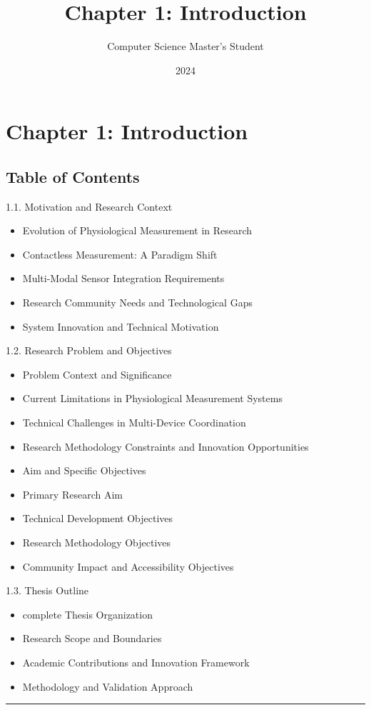 \documentclass[11pt,a4paper]{article}
\title{Chapter 1: Introduction}
\author{Computer Science Master's Student}
\date{2024}
\begin{document}
\maketitle

\section{Chapter 1: Introduction}

\subsection{Table of Contents}

1.1. Motivation and Research Context

\begin{itemize}
\item Evolution of Physiological Measurement in Research
\item Contactless Measurement: A Paradigm Shift
\item Multi-Modal Sensor Integration Requirements
\item Research Community Needs and Technological Gaps
\item System Innovation and Technical Motivation

\end{itemize}
1.2. Research Problem and Objectives

\begin{itemize}
\item Problem Context and Significance
\item Current Limitations in Physiological Measurement Systems
\item Technical Challenges in Multi-Device Coordination
\item Research Methodology Constraints and Innovation Opportunities
\item Aim and Specific Objectives
\item Primary Research Aim
\item Technical Development Objectives
\item Research Methodology Objectives
\item Community Impact and Accessibility Objectives

\end{itemize}
1.3. Thesis Outline

\begin{itemize}
\item complete Thesis Organization
\item Research Scope and Boundaries
\item Academic Contributions and Innovation Framework
\item Methodology and Validation Approach

\end{itemize}
\hrule
\end{document}
